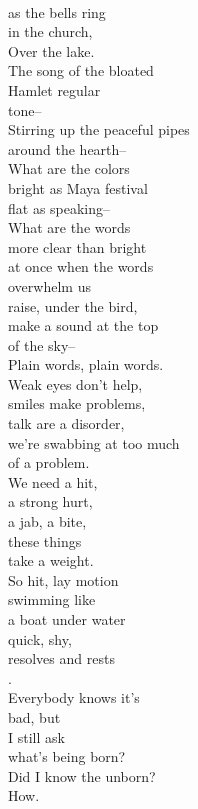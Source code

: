 \documentclass[smalldemyvopaper,11pt,twoside,onecolumn,openright,extrafontsizes]{memoir}
\begin{document}
\\as the bells ring
\\in the church,
\\Over the lake.
\\The song of the bloated
\\Hamlet regular
\\tone--
\\Stirring up the peaceful pipes
\\around the hearth--
\\What are the colors
\\bright as Maya festival
\\flat as speaking--
\\What are the words
\\more clear than bright
\\at once when the words
\\overwhelm us
\\raise, under the bird,
\\make a sound at the top
\\of the sky--
\\Plain words, plain words.
\\Weak eyes don't help,
\\smiles make problems,
\\talk are a disorder,
\\we're swabbing at too much
\\of a problem.
\\We need a hit,
\\a strong hurt,
\\a jab, a bite,
\\these things
\\take a weight.
\\So hit, lay motion
\\swimming like
\\a boat under water
\\quick, shy,
\\resolves and rests
\\.
\\Everybody knows it's
\\bad, but
\\I still ask
\\what's being born?
\\Did I know the unborn?
\\How.
\end{document}

